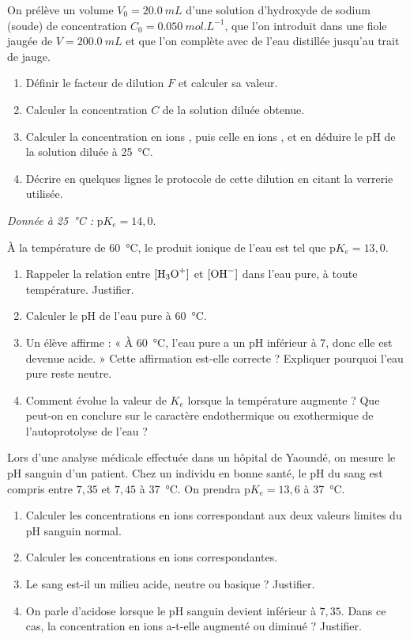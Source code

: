 \documentclass[11pt]{article}
\begin{document}
\begin{exercice}
On prélève un volume $V_0 = \SI{20,0}{mL}$ d'une solution d'hydroxyde de sodium (soude) de concentration $C_0 = \SI{0,050}{mol.L^{-1}}$, que l'on introduit dans une fiole jaugée de $V = \SI{200,0}{mL}$ et que l'on complète avec de l'eau distillée jusqu'au trait de jauge.
\begin{enumerate}
\item Définir le facteur de dilution $F$ et calculer sa valeur.
\item Calculer la concentration $C$ de la solution diluée obtenue.
\item Calculer la concentration en ions , puis celle en ions , et en déduire le pH de la solution diluée à \SI{25}{\celsius}.
\item Décrire en quelques lignes le protocole de cette dilution en citant la verrerie utilisée.
\end{enumerate}
\emph{Donnée à \SI{25}{\celsius} :} p$K_e = 14{,}0$.
\end{exercice}

\begin{exercice}
À la température de \SI{60}{\celsius}, le produit ionique de l'eau est tel que p$K_e = 13{,}0$.
\begin{enumerate}
\item Rappeler la relation entre $[\ce{H3O+}]$ et $[\ce{OH-}]$ dans l'eau pure, à toute température. Justifier.
\item Calculer le pH de l'eau pure à \SI{60}{\celsius}.
\item Un élève affirme : « À \SI{60}{\celsius}, l'eau pure a un pH inférieur à 7, donc elle est devenue acide. » Cette affirmation est-elle correcte ? Expliquer pourquoi l'eau pure reste neutre.
\item Comment évolue la valeur de $K_e$ lorsque la température augmente ? Que peut-on en conclure sur le caractère endothermique ou exothermique de l'autoprotolyse de l'eau ?
\end{enumerate}
\end{exercice}

\begin{exercice}[Le pH du sang]
Lors d'une analyse médicale effectuée dans un hôpital de Yaoundé, on mesure le pH sanguin d'un patient. Chez un individu en bonne santé, le pH du sang est compris entre $7{,}35$ et $7{,}45$ à \SI{37}{\celsius}. On prendra p$K_e = 13{,}6$ à \SI{37}{\celsius}.
\begin{enumerate}
\item Calculer les concentrations en ions  correspondant aux deux valeurs limites du pH sanguin normal.
\item Calculer les concentrations en ions  correspondantes.
\item Le sang est-il un milieu acide, neutre ou basique ? Justifier.
\item On parle d'acidose lorsque le pH sanguin devient inférieur à $7{,}35$. Dans ce cas, la concentration en ions  a-t-elle augmenté ou diminué ? Justifier.
\end{enumerate}
\end{exercice}
\end{document}
